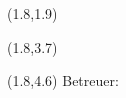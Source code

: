 \begin{textblock}{11}(1.8,1.9)
	\sffamily%
	\huge%
	\Centering%
	\textbf{\WorkTitleDivided}
\end{textblock}
\begin{textblock}{11}(1.8,3.7)
	\Centering%
	\sffamily%
	\Large
	\textbf{\AuthorName}
	\newline
\end{textblock}
\begin{textblock}{11}(1.8,4.6)
	\Centering
	\sffamily%
	\large
	Betreuer: \Reviewer
\end{textblock}
